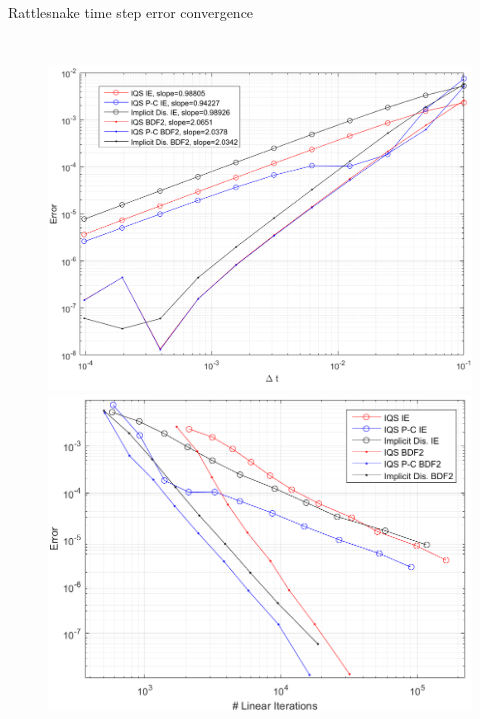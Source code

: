 \documentclass[8pt,xcolor=dvipnames]{beamer}
\begin{document}
\begin{frame}{Rattlesnake time step error convergence}

\begin{columns}
\column{\dimexpr\paperwidth-10pt}
\begin{figure}
\includegraphics[width=0.5\paperwidth]{figures/1D_conv_Rat.png}
\includegraphics[width=0.5\paperwidth]{figures/1D_conv_lin.png}
\end{figure}
\end{columns}

\end{frame}
\end{document}
